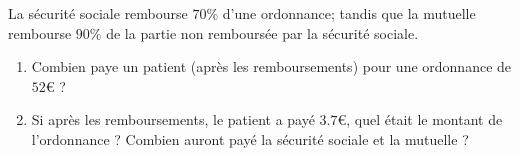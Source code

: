 
\begin{exercice}\label{exosmath-0421}

La sécurité sociale rembourse \( 70\%\) d'une ordonnance; tandis que la mutuelle rembourse \( 90\%\) de la partie non remboursée par la sécurité sociale.
\begin{enumerate}
    \item
        Combien paye un patient (après les remboursements) pour une ordonnance de \( 52\)€ ?
    \item
        Si après les remboursements, le patient a payé \( 3.7\)€, quel était le montant de l'ordonnance ? Combien auront payé la sécurité sociale et la mutuelle ?
\end{enumerate}

\end{exercice}
